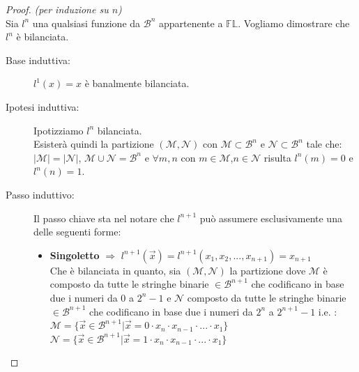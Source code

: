\documentclass[12pt,a4paper,openright]{report}
\begin{document}
\begin{proof} \textit{(per induzione su $n$)\\}
    Sia $l^n$ una qualsiasi funzione da $\mathcal{B}^n$ appartenente a $\mathbb{FL}$.  Vogliamo dimostrare che $l^n$ è bilanciata.\\
    \begin{description}
        \item[Base induttiva:] $l^1(x)=x$ è banalmente bilanciata.
        \item[Ipotesi induttiva:] Ipotizziamo $l^n$ bilanciata.\\
                                      Esisterà quindi la partizione $(\mathcal{M},\mathcal{N})$ con $\mathcal{M}\subset\mathcal{B}^n$ e $\mathcal{N}\subset\mathcal{B}^n$ tale che:\\
                                      ${\left\vert{\mathcal{M}}\right\vert} = {\left\vert{\mathcal{N}}\right\vert}$, $\mathcal{M} \cup \mathcal{N} = \mathcal{B}^n$ e $\forall m,n$ con
                                      $m\in\mathcal{M}$,$n \in\mathcal{N}$ risulta $l^n(m) = 0$ e $ l^n(n) = 1$.
        \item[Passo induttivo:] Il passo chiave sta nel notare che $l^{n+1}$ può assumere esclusivamente una delle seguenti forme:
                                \begin{itemize}
                                    \item \textbf{Singoletto} $\Rightarrow$ $l^{n+1}(\vec{x}) = l^{n+1}(x_1,x_2,...,x_{n+1})=x_{n+1}$\\
                                                              Che è bilanciata in quanto, sia $(\mathcal{M},\mathcal{N})$ la partizione dove $\mathcal{M}$ è composto da tutte le stringhe
                                                              binarie $\in \mathcal{B}^{n+1}$ che codificano in base due i numeri da $0$ a $2^n - 1$ e $\mathcal{N}$ composto da tutte le stringhe binarie
                                                              $\in \mathcal{B}^{n+1}$ che codificano in base due i numeri da $2^n$ a $2^{n+1} - 1$ i.e. :\\
                                                              $\mathcal{M}= \{\vec x \in \mathcal{B}^{n+1} | \vec x = 0\cdot x_n \cdot x_{n-1}\cdot ...\cdot x_1\}$\\
                                                              $\mathcal{N}= \{\vec x \in \mathcal{B}^{n+1} | \vec x = 1\cdot x_n \cdot x_{n-1}\cdot ...\cdot x_1\}$\\

\end{itemize}
\end{description}
\end{proof}
\end{document}
